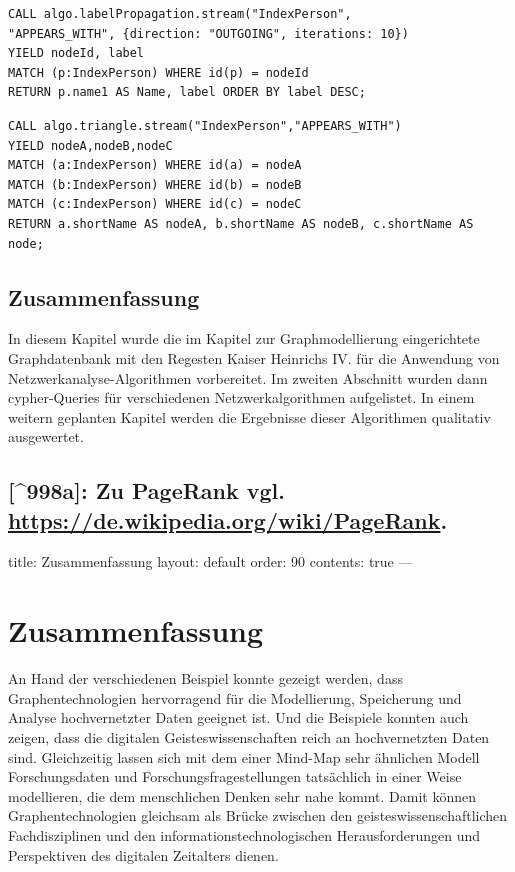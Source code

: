 \documentclass[12pt,ngerman,]{article}
\begin{document}
\begin{verbatim}
CALL algo.labelPropagation.stream("IndexPerson",
"APPEARS_WITH", {direction: "OUTGOING", iterations: 10})
YIELD nodeId, label
MATCH (p:IndexPerson) WHERE id(p) = nodeId
RETURN p.name1 AS Name, label ORDER BY label DESC;
\end{verbatim}

\begin{verbatim}
CALL algo.triangle.stream("IndexPerson","APPEARS_WITH")
YIELD nodeA,nodeB,nodeC
MATCH (a:IndexPerson) WHERE id(a) = nodeA
MATCH (b:IndexPerson) WHERE id(b) = nodeB
MATCH (c:IndexPerson) WHERE id(c) = nodeC
RETURN a.shortName AS nodeA, b.shortName AS nodeB, c.shortName AS node;
\end{verbatim}

\subsection{Zusammenfassung}\label{zusammenfassung-8}

In diesem Kapitel wurde die im Kapitel zur Graphmodellierung
eingerichtete Graphdatenbank mit den Regesten Kaiser Heinrichs IV. für
die Anwendung von Netzwerkanalyse-Algorithmen vorbereitet. Im zweiten
Abschnitt wurden dann cypher-Queries für verschiedenen
Netzwerkalgorithmen aufgelistet. In einem weitern geplanten Kapitel
werden die Ergebnisse dieser Algorithmen qualitativ ausgewertet.

\subsection{\texorpdfstring{{[}\^{}998a{]}: Zu PageRank vgl.
\url{https://de.wikipedia.org/wiki/PageRank}.}{{[}\^{}998a{]}: Zu PageRank vgl. https://de.wikipedia.org/wiki/PageRank.}}\label{a-zu-pagerank-vgl.-httpsde.wikipedia.orgwikipagerank.}

title: Zusammenfassung layout: default order: 90 contents: true ---

\section{Zusammenfassung}\label{zusammenfassung-9}

An Hand der verschiedenen Beispiel konnte gezeigt werden, dass
Graphentechnologien hervorragend für die Modellierung, Speicherung und
Analyse hochvernetzter Daten geeignet ist. Und die Beispiele konnten
auch zeigen, dass die digitalen Geisteswissenschaften reich an
hochvernetzten Daten sind. Gleichzeitig lassen sich mit dem einer
Mind-Map sehr ähnlichen Modell Forschungsdaten und
Forschungsfragestellungen tatsächlich in einer Weise modellieren, die
dem menschlichen Denken sehr nahe kommt. Damit können
Graphentechnologien gleichsam als Brücke zwischen den
geisteswissenschaftlichen Fachdisziplinen und den
informationstechnologischen Herausforderungen und Perspektiven des
digitalen Zeitalters dienen.
\end{document}
